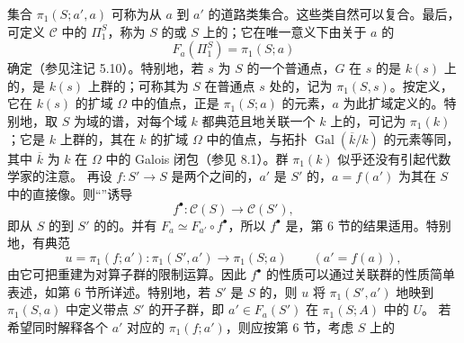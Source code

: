 集合 $\pi_1(S;a',a)$ 可称为从 $a$ 到 $a'$ 的道路类集合。这些类自然可以复合。最后，可定义 $\mathcal C$ 中的 $\Pi_1^S$，称为 $S$ 的或 $S$ 上的；它在唯一意义下由关于 $a$ 的
\[F_a(\Pi_1^S)=\pi_1(S;a)\]
确定（参见注记 5.10）。特别地，若 $s$ 为 $S$ 的一个普通点，$G$ 在 $s$ 的是 $k(s)$ 上的，是 $k(s)$ 上群的；可称其为 $S$ 在普通点 $s$ 处的，记为 $\pi_1(S,s)$。按定义，它在 $k(s)$ 的扩域 $\Omega$ 中的值点，正是 $\pi_1(S;a)$ 的元素，$a$ 为此扩域定义的。特别地，取 $S$ 为域的谱，对每个域 $k$ 都典范且地关联一个 $k$ 上的，可记为 $\pi_1(k)$；它是 $k$ 上群的，其在 $k$ 的扩域 $\Omega$ 中的值点，与拓扑 $\operatorname{Gal}(\overline k/k)$ 的元素等同，其中 $\overline k$ 为 $k$ 在 $\Omega$ 中的 Galois 闭包（参见 8.1）。群 $\pi_1(k)$ 似乎还没有引起代数学家的注意。
再设 $f:S'\to S$ 是两个之间的，$a'$ 是 $S'$ 的，$a=f(a')$ 为其在 $S$ 中的直接像。则“”诱导
\[f^\bullet:\mathcal C(S)\longrightarrow\mathcal C(S'),\]
即从 $S$ 的到 $S'$ 的的。并有 $F_a\simeq F_{a'}\circ f^\bullet$，所以 $f^\bullet$ 是，第 6 节的结果适用。特别地，有典范
\[u=\pi_1(f;a'):\pi_1(S',a')\longrightarrow\pi_1(S;a)\qquad(a'=f(a)),\]
由它可把重建为对算子群的限制运算。因此 $f^\bullet$ 的性质可以通过关联群的性质简单表述，如第 6 节所详述。特别地，若 $S'$ 是 $S$ 的，则 $u$ 将 $\pi_1(S',a')$ 地映到 $\pi_1(S,a)$ 中定义带点 $S'$ 的开子群，即 $a'\in F_a(S')$ 在 $\pi_1(S;A)$ 中的 $U$。
若希望同时解释各个 $a'$ 对应的 $\pi_1(f;a')$，则应按第 6 节，考虑 $S$ 上的
